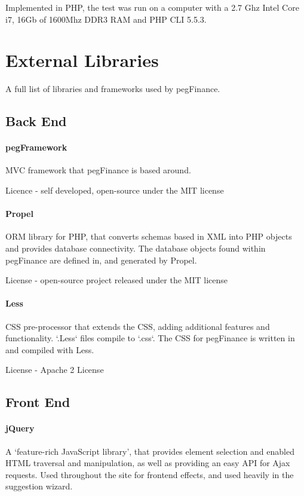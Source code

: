 \begin{appendices}
Implemented in PHP, the test was run on a computer with a 2.7 Ghz Intel Core i7, 16Gb of 1600Mhz DDR3 RAM and PHP CLI 5.5.3.



\chapter{External Libraries} \label{app:externallibraries}

A full list of libraries and frameworks used by pegFinance.

\section{Back End}
\subsubsection{pegFramework}
MVC framework that pegFinance is based around. 

Licence - self developed, open-source under the MIT license

\subsubsection{Propel}
ORM library for PHP, that converts schemas based in XML into PHP objects and provides database connectivity.
%
The database objects found within pegFinance are defined in, and generated by Propel. 

License - open-source project released under the MIT license

\subsubsection{Less}
CSS pre-processor that extends the CSS, adding additional features and functionality. `.Less` files compile to `.css`.
%
The CSS for pegFinance is written in and compiled with Less.

License - Apache 2 License

\section{Front End}
\subsubsection{jQuery}
A `feature-rich JavaScript library', that provides element selection and enabled HTML traversal and manipulation, as well as providing an easy API for Ajax requests.
%
Used throughout the site for frontend effects, and used heavily in the suggestion wizard.


\end{appendices}

